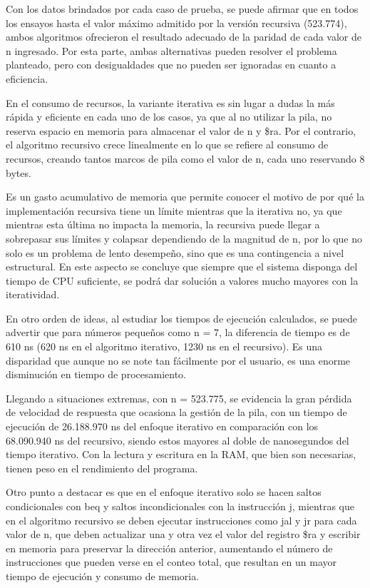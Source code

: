 \documentclass[12pt, letterpaper]{article}
\begin{document}
Con los datos brindados por cada caso de prueba, se puede afirmar que en todos los ensayos hasta el valor máximo admitido por la versión recursiva (523.774), ambos algoritmos ofrecieron el resultado adecuado de la paridad de cada valor de n ingresado. Por esta parte, ambas alternativas pueden resolver el problema planteado, pero con desigualdades que no pueden ser ignoradas en cuanto a eficiencia.

En el consumo de recursos, la variante iterativa es sin lugar a dudas la más rápida y eficiente en cada uno de los casos, ya que al no utilizar la pila, no reserva espacio en memoria para almacenar el valor de n y \$ra. Por el contrario, el algoritmo recursivo crece linealmente en lo que se refiere al consumo de recursos, creando tantos marcos de pila como el valor de n, cada uno reservando 8 bytes.

Es un gasto acumulativo de memoria que permite conocer el motivo de por qué la implementación recursiva tiene un límite mientras que la iterativa no, ya que mientras esta última no impacta la memoria, la recursiva puede llegar a sobrepasar sus límites y colapsar dependiendo de la magnitud de n, por lo que no solo es un problema de lento desempeño, sino que es una contingencia a nivel estructural. En este aspecto se concluye que siempre que el sistema disponga del tiempo de CPU suficiente, se podrá dar solución a valores mucho mayores con la iteratividad.

En otro orden de ideas, al estudiar los tiempos de ejecución calculados, se puede advertir que para números pequeños como n = 7, la diferencia de tiempo es de 610 ns (620 ns en el algoritmo iterativo, 1230 ns en el recursivo). Es una disparidad que aunque no se note tan fácilmente por el usuario, es una enorme disminución en tiempo de procesamiento.

Llegando a situaciones extremas, con n = 523.775, se evidencia la gran pérdida de velocidad de respuesta que ocasiona la gestión de la pila, con un tiempo de ejecución de 26.188.970 ns del enfoque iterativo en comparación con los 68.090.940 ns del recursivo, siendo estos mayores al doble de nanosegundos del tiempo iterativo. Con la lectura y escritura en la RAM, que bien son necesarias, tienen peso en el rendimiento del programa.

Otro punto a destacar es que en el enfoque iterativo solo se hacen saltos condicionales con beq y saltos incondicionales con la instrucción j, mientras que en el algoritmo recursivo se deben ejecutar instrucciones como jal y jr para cada valor de n, que deben actualizar una y otra vez el valor del registro \$ra y escribir en memoria para preservar la dirección anterior, aumentando el número de instrucciones que pueden verse en el conteo total, que resultan en un mayor tiempo de ejecución y consumo de memoria. 
\end{document}
